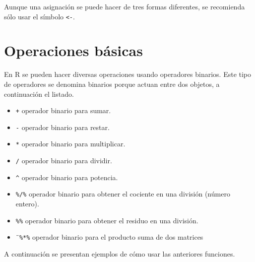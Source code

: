 \documentclass[
]{book}
\makeatletter
\providecommand{\tightlist}{%
  \setlength{\itemsep}{0pt}\setlength{\parskip}{0pt}}
\newenvironment{kframe}{%
\medskip{}
\setlength{\fboxsep}{.8em}
 \def\at@end@of@kframe{}%
 \ifinner\ifhmode%
  \def\at@end@of@kframe{\end{minipage}}%
  \begin{minipage}{\columnwidth}%
 \fi\fi%
 \def\FrameCommand##1{\hskip\@totalleftmargin \hskip-\fboxsep
 \colorbox{shadecolor}{##1}\hskip-\fboxsep
     \hskip-\linewidth \hskip-\@totalleftmargin \hskip\columnwidth}%
 \MakeFramed {\advance\hsize-\width
   \@totalleftmargin\z@ \linewidth\hsize
   \@setminipage}}%
 {\par\unskip\endMakeFramed%
 \at@end@of@kframe}
\newenvironment{rmdblock}[1]
  {
  \begin{itemize}
  \renewcommand{\labelitemi}{
    \raisebox{-.7\height}[0pt][0pt]{
      {\setkeys{Gin}{width=3em,keepaspectratio}\texttt{[image: images/\#1]}}
    }
  }
  \setlength{\fboxsep}{1em}
  \begin{kframe}
  \item
  }
  {
  \end{kframe}
  \end{itemize}
  }
\newenvironment{rmdimportant}
  {\begin{rmdblock}{important}}
  {\end{rmdblock}}
\makeatother
\begin{document}
\begin{rmdimportant}
Aunque una asignación se puede hacer de tres formas diferentes, se recomienda sólo usar el símbolo \texttt{\textless{}-}.
\end{rmdimportant}

\hypertarget{operaciones-buxe1sicas}{%
\section{Operaciones básicas}\label{operaciones-buxe1sicas}}

En R se pueden hacer diversas operaciones usando operadores binarios. Este tipo de operadores se denomina binarios porque actuan entre dos objetos, a continuación el listado.

\begin{itemize}
\tightlist
\item
  \texttt{+} operador binario para sumar.
\item
  \texttt{-} operador binario para restar.
\item
  \texttt{*} operador binario para multiplicar.
\item
  \texttt{/} operador binario para dividir.
\item
  \texttt{\^{}} operador binario para potencia.
\item
  \texttt{\%/\%} operador binario para obtener el cociente en una división (número entero).
\item
  \texttt{\%\%} operador binario para obtener el residuo en una división.
\item
  \texttt{¨\%*\%} operador binario para el producto suma de dos matrices
\end{itemize}

A continuación se presentan ejemplos de cómo usar las anteriores funciones.
\end{document}
